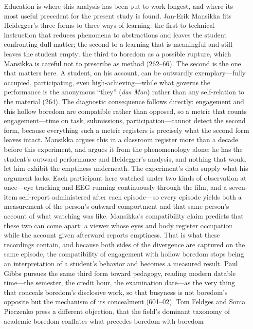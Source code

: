 Education is where this analysis has been put to work longest, and where its most useful
precedent for the present study is found. Jan-Erik Mansikka fits Heidegger's three forms to
three ways of learning: the first to technical instruction that reduces phenomena to
abstractions and leaves the student confronting dull matter; the second to a learning that is
meaningful and still leaves the student empty; the third to boredom as a possible rupture,
which Mansikka is careful not to prescribe as method (262--66). The second is the one that
matters here. A student, on his account, can be outwardly exemplary---fully occupied,
participating, even high-achieving---while what governs the performance is the anonymous
``they'' (\textit{das Man}) rather than any self-relation to the material (264). The
diagnostic consequence follows directly: engagement and this hollow boredom are compatible
rather than opposed, so a metric that counts engagement---time on task, submissions,
participation---cannot detect the second form, because everything such a metric registers is
precisely what the second form leaves intact. Mansikka argues this in a classroom register
more than a decade before this experiment, and argues it from the phenomenology alone: he has
the student's outward performance and Heidegger's analysis, and nothing that would let him
exhibit the emptiness underneath. The experiment's data supply what his argument lacks. Each
participant here watched under two kinds of observation at once---eye tracking and EEG running
continuously through the film, and a seven-item self-report administered after each
episode---so every episode yields both a measurement of the person's outward comportment and
that same person's account of what watching was like. Mansikka's compatibility claim predicts
that these two can come apart: a viewer whose eyes and body register occupation while the
account given afterward reports emptiness. That is what these recordings contain, and because
both sides of the divergence are captured on the same episode, the compatibility of engagement
with hollow boredom stops being an interpretation of a student's behavior and becomes a
measured result. Paul Gibbs pursues the same third form toward pedagogy, reading modern datable time---the
semester, the credit hour, the examination date---as the very thing that conceals boredom's
disclosive work, so that busyness is not boredom's opposite but the mechanism of its
concealment (601--02). Tom Feldges and Sonia Pieczenko press a different objection, that the
field's dominant taxonomy of academic boredom conflates what precedes boredom with boredom
